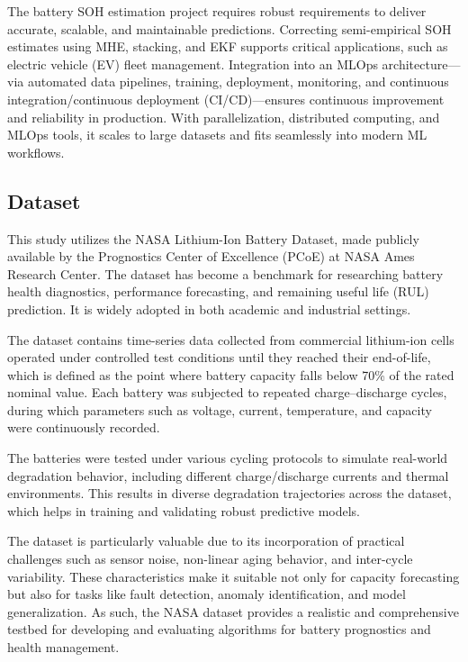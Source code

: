 The battery SOH estimation project requires robust requirements to deliver accurate, scalable, and maintainable predictions. Correcting semi-empirical SOH estimates using MHE, stacking, and EKF supports critical applications, such as electric vehicle (EV) fleet management. Integration into an MLOps architecture—via automated data pipelines, training, deployment, monitoring, and continuous integration/continuous deployment (CI/CD)—ensures continuous improvement and reliability in production. With parallelization, distributed computing, and MLOps tools, it scales to large datasets and fits seamlessly into modern ML workflows.

\subsection{Dataset}

This study utilizes the NASA Lithium-Ion Battery Dataset, made publicly available by the Prognostics Center of Excellence (PCoE) at NASA Ames Research Center. The dataset has become a benchmark for researching battery health diagnostics, performance forecasting, and remaining useful life (RUL) prediction. It is widely adopted in both academic and industrial settings.

The dataset contains time-series data collected from commercial lithium-ion cells operated under controlled test conditions until they reached their end-of-life, which is defined as the point where battery capacity falls below 70\% of the rated nominal value. Each battery was subjected to repeated charge–discharge cycles, during which parameters such as voltage, current, temperature, and capacity were continuously recorded.

The batteries were tested under various cycling protocols to simulate real-world degradation behavior, including different charge/discharge currents and thermal environments. This results in diverse degradation trajectories across the dataset, which helps in training and validating robust predictive models.

The dataset is particularly valuable due to its incorporation of practical challenges such as sensor noise, non-linear aging behavior, and inter-cycle variability. These characteristics make it suitable not only for capacity forecasting but also for tasks like fault detection, anomaly identification, and model generalization. As such, the NASA dataset provides a realistic and comprehensive testbed for developing and evaluating algorithms for battery prognostics and health management.


